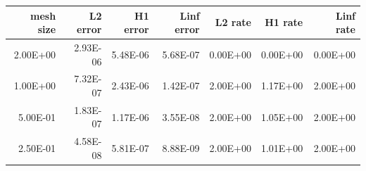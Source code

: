 \begin{tabular}{rrrrrrr}
\toprule
mesh size & L2 error & H1 error & Linf error & L2 rate & H1 rate & Linf rate \\
\midrule
2.00E+00 & 2.93E-06 & 5.48E-06 & 5.68E-07 & 0.00E+00 & 0.00E+00 & 0.00E+00 \\
1.00E+00 & 7.32E-07 & 2.43E-06 & 1.42E-07 & 2.00E+00 & 1.17E+00 & 2.00E+00 \\
5.00E-01 & 1.83E-07 & 1.17E-06 & 3.55E-08 & 2.00E+00 & 1.05E+00 & 2.00E+00 \\
2.50E-01 & 4.58E-08 & 5.81E-07 & 8.88E-09 & 2.00E+00 & 1.01E+00 & 2.00E+00 \\
\bottomrule
\end{tabular}
